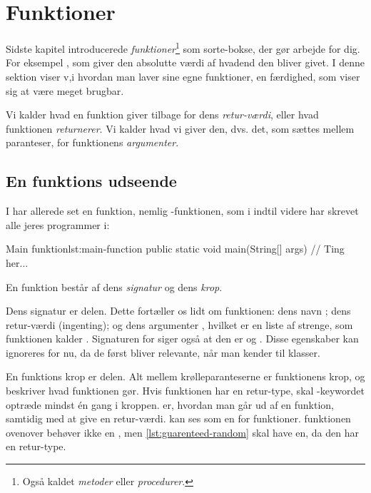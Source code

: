 
\section{Funktioner}

    Sidste kapitel introducerede \emph{funktioner}\footnote{Også
    kaldet \emph{metoder} eller \emph{procedurer}.} som sorte-bokse,
    der gør arbejde for dig. For eksempel , som
    giver den absolutte værdi af hvadend den bliver givet. I denne
    sektion viser v,i hvordan man laver sine egne funktioner, en
    færdighed, som viser sig at være meget brugbar.

    Vi kalder hvad en funktion giver tilbage for dens
    \emph{retur-værdi}, eller hvad funktionen \emph{returnerer}. Vi
    kalder hvad vi giver den, dvs. det, som sættes mellem paranteser,
    for funktionens \emph{argumenter}.


	\subsection{En funktions udseende}

		I har allerede set en funktion, nemlig -funktionen, som i
		indtil videre har skrevet alle jeres programmer i:

		\begin{JavaCode}{Main funktion}{lst:main-function}
			public static void main(String[] args) {
				// Ting her...
			}
		\end{JavaCode}

		En funktion består af dens \emph{signatur} og dens \emph{krop}.

        Dens signatur er 
        delen.  Dette fortæller os lidt om funktionen: dens
        navn ; dens retur-værdi  (ingenting); og
        dens argumenter , hvilket er en liste af
        strenge, som funktionen kalder .  Signaturen for
         siger også at den er  og
        . Disse egenskaber kan ignoreres for nu, da de
        først bliver relevante, når man kender til klasser.

        En funktions krop er  delen. Alt
        mellem krølleparanteserne er funktionens krop, og beskriver
        hvad funktionen gør.  Hvis funktionen har en retur-type, skal
        -keywordet optræde mindst én gang i kroppen.
         er, hvordan man går ud af en funktion,
        samtidig med at give en retur-værdi.   kan
        ses som en  for funktioner.
         funktionen ovenover behøver ikke en
        , men \autoref{lst:guarenteed-random}
        skal have en, da den har en retur-type.

